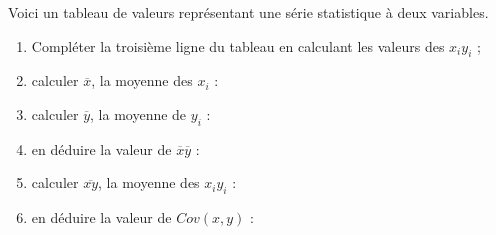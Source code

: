 \documentclass[11pt]{article}
\begin{document}
\begin{exercice}[1][Covariance]
Voici un tableau de valeurs représentant une série statistique à deux variables.

\begin{center}

\end{center}

\begin{enumerate}
\item Compléter la troisième ligne du tableau en calculant les valeurs
des $x_iy_i$ ;
\item calculer $\overline{x}$, la moyenne des $x_i$ : \dotfill \\ \dtf
\item calculer $\overline{y}$, la moyenne de $y_i$ : \dotfill  \\ \dtf
\item en déduire la valeur de $\overline{x}\overline{y}$ : \dotfill
\item calculer $\overline{xy}$, la moyenne des $x_iy_i$ : \dotfill  \\ \dtf
\item en déduire la valeur de $Cov(x,y)$ : \dotfill
\end{enumerate}
\end{exercice}
\end{document}
